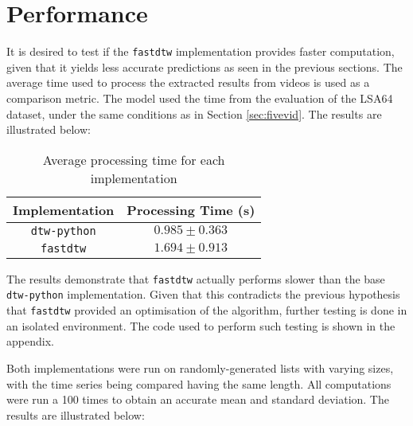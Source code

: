 \documentclass[final,rdr32.tex]{subfiles}
\begin{document}
\section{Performance}
\label{sec:performance}

It is desired to test if the \verb|fastdtw| implementation provides faster computation, given that it yields less accurate predictions as seen in the previous sections. The average time used to process the extracted results from videos is used as a comparison metric. The model used the time from the evaluation of the LSA64 dataset, under the same conditions as in Section \ref{sec:fivevid}. The results are illustrated below:

\begin{table}[H]
    \begin{center}
        \begin{tabular}{ |c|c| }
            \hline
            Implementation    & Processing Time (s) \\
            \hline
            \verb|dtw-python| & $0.985 \pm 0.363$   \\
            \verb|fastdtw|    & $1.694 \pm 0.913$   \\
            \hline
        \end{tabular}
    \end{center}
    \caption{Average processing time for each implementation}
    \label{tab:time}
\end{table}

The results demonstrate that \verb|fastdtw| actually performs slower than the base \\ \verb|dtw-python| implementation. Given that this contradicts the previous hypothesis that \verb|fastdtw| provided an optimisation of the algorithm, further testing is done in an isolated environment. The code used to perform such testing is shown in the appendix.

Both implementations were run on randomly-generated lists with varying sizes, with the time series being compared having the same length. All computations were run a 100 times to obtain an accurate mean and standard deviation. The results are illustrated below:
\end{document}

